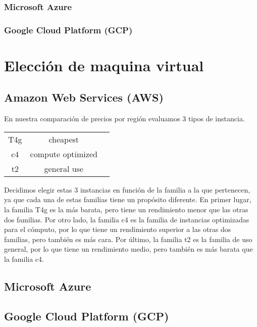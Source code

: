 \documentclass{article}
\begin{document}
  
  \subsubsection*{Microsoft Azure}
  \subsubsection*{Google Cloud Platform (GCP)}

\section{Elección de maquina virtual}
  \subsection{Amazon Web Services (AWS)}

    En nuestra comparación de precios por región evaluamos 3 tipos de instancia.
      \begin{table}[!htp]\centering
        \begin{tabular}{|c|c|c|}

          T4g	& cheapest          \\
          c4	& compute optimized \\
          t2	& general use       \\
          
        \end{tabular}
      \end{table}
    Decidimos elegir estas 3 instancias en función de la familia a la que pertenecen, ya que cada una de estas familias tiene un propósito diferente.
    En primer lugar, la familia T4g es la más barata, pero tiene un rendimiento menor que las otras dos familias. Por otro lado, la familia c4 es la familia de instancias optimizadas para el cómputo, por lo que tiene un rendimiento superior a las otras dos familias, pero también es más cara. Por último, la familia t2 es la familia de uso general, por lo que tiene un rendimiento medio, pero también es más barata que la familia c4.


  \subsection{Microsoft Azure}
  \subsection{Google Cloud Platform (GCP)}
\end{document}
